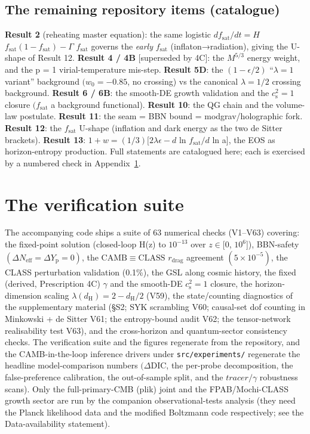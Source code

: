 \documentclass[preprint,12pt]{elsarticle}
\begin{document}
\subsection{The remaining repository items (catalogue)}\label{sec-A-7}

\textbf{Result 2} (reheating master equation): the same logistic
\(df_{\mathrm{sat}}/dt = H\)
\(f_{\mathrm{sat}}(1 - f_{\mathrm{sat}}) - \Gamma\) \(f_{\mathrm{sat}}\)
governs the \emph{early} \(f_{\mathrm{sat}}\) (inflaton→radiation),
giving the U-shape of Result 12. \textbf{Result 4 / 4B} {[}superseded by
4C{]}: the \(M^{5/3}\) energy weight, and the p = 1 virial-temperature
mis-step. \textbf{Result 5D}: the \((1 - \epsilon /2)\)
``\(\lambda  = 1\) variant'' background \((w_{0} = -0.85\), no crossing)
vs the canonical \(\lambda  = 1/2\) crossing background. \textbf{Result
6 / 6B}: the smooth-DE growth validation and the
\(c_{\mathrm{s}}^{2} = 1\) closure \((f_{\mathrm{sat}}\) a background
functional). \textbf{Result 10}: the QG chain and the volume-law
postulate. \textbf{Result 11}: the seam = BBN bound =
modgrav/holographic fork. \textbf{Result 12}: the \(f_{\mathrm{sat}}\)
U-shape (inflation and dark energy as the two de Sitter brackets).
\textbf{Result 13}: \(1 + w = (1/3)[2\lambda \epsilon  - d\) ln
\(f_{\mathrm{sat}}/d\) ln a{]}, the EOS as horizon-entropy production.
Full statements are catalogued here; each is exercised by a numbered
check in Appendix~\ref{sec-B}.

\section{The verification suite}\label{sec-B}

The accompanying code ships a suite of 63 numerical checks (V1--V63)
covering: the fixed-point solution (closed-loop H(z) to \(10^{-13}\)
over \(z \in  [0\), \(10^{6}\){]}), BBN-safety
\((\Delta N_{\mathrm{eff}} = \Delta Y_{\mathrm{p}} = 0)\), the
\(\mathrm{CAMB}\equiv \mathrm{CLASS}\) \(r_{\mathrm{drag}}\) agreement
\((5\times 10^{-5})\), the CLASS perturbation validation (0.1\%), the
GSL along cosmic history, the fixed (derived, Prescription 4C)
\(\gamma\) and the smooth-DE \(c_{\mathrm{s}}^{2} = 1\) closure, the
horizon-dimension scaling
\(\lambda (d_{\mathrm{H}}) = 2 - d_{\mathrm{H}}/2\) (V59), the
state/counting diagnostics of the supplementary material (§S2; SYK
scrambling V60; causal-set dof counting in Minkowski + de Sitter V61;
the entropy-bound audit V62; the tensor-network realisability test V63),
and the cross-horizon and quantum-sector consistency checks. The
verification suite and the figures regenerate from the repository, and
the CAMB-in-the-loop inference drivers under \texttt{src/\allowbreak experiments/\allowbreak }
regenerate the headline model-comparison numbers
\((\Delta \mathrm{DIC}\), the per-probe decomposition, the
false-preference calibration, the out-of-sample split, and the
\(tracer/\gamma\) robustness scans). Only the full-primary-CMB (plik)
joint and the FPAB/Mochi-CLASS growth sector are run by the companion
observational-tests analysis \citep{Pandev:2026obstest} (they need the
Planck likelihood data and the modified Boltzmann code respectively; see
the Data-availability statement).
\end{document}
